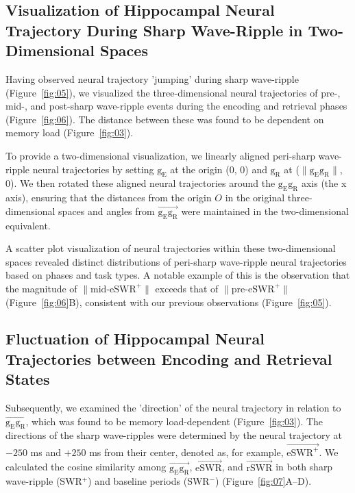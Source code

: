 \documentclass[final,3p,times,twocolumn]{elsarticle}
\begin{document}
\subsection{Visualization of Hippocampal Neural Trajectory During Sharp Wave-Ripple in Two-Dimensional Spaces}
Having observed neural trajectory 'jumping' during sharp wave-ripple (Figure~\ref{fig:05}), we visualized the three-dimensional neural trajectories of pre-, mid-, and post-sharp wave-ripple events during the encoding and retrieval phases (Figure~\ref{fig:06}). The distance between these was found to be dependent on memory load (Figure~\ref{fig:03}).

To provide a two-dimensional visualization, we linearly aligned peri-sharp wave-ripple neural trajectories by setting $\mathrm{g_{E}}$ at the origin (0, 0) and $\mathrm{g_{R}}$ at ($\mathrm{\lVert g_{E}g_{R} \rVert}$, 0). We then rotated these aligned neural trajectories around the $\mathrm{g_{E}g_{R}}$ axis (the x axis), ensuring that the distances from the origin $O$ in the original three-dimensional spaces and angles from $\overrightarrow{\mathrm{g_{E}g_{R}}}$ were maintained in the two-dimensional equivalent.

A scatter plot visualization of neural trajectories within these two-dimensional spaces revealed distinct distributions of peri-sharp wave-ripple neural trajectories based on phases and task types. A notable example of this is the observation that the magnitude of $\mathrm{\lVert \text{mid-eSWR}^+ \rVert}$ exceeds that of $\mathrm{\lVert \text{pre-eSWR}^+ \rVert}$ (Figure~\ref{fig:06}B), consistent with our previous observations (Figure~\ref{fig:05}).

\subsection{Fluctuation of Hippocampal Neural Trajectories between Encoding and Retrieval States}
Subsequently, we examined the 'direction' of the neural trajectory in relation to $\overrightarrow{\mathrm{g_{E}g_{R}}}$, which was found to be memory load-dependent (Figure~\ref{fig:03}). The directions of the sharp wave-ripples were determined by the neural trajectory at $-250$ ms and $+250$ ms from their center, denoted as, for example, $\overrightarrow{\mathrm{eSWR^+}}$. We calculated the cosine similarity among $\overrightarrow{\mathrm{g_{E}g_{R}}}$, $\overrightarrow{\mathrm{eSWR}}$, and $\overrightarrow{\mathrm{rSWR}}$ in both sharp wave-ripple (SWR$^+$) and baseline periods (SWR$^-$) (Figure~\ref{fig:07}A--D).
\end{document}
